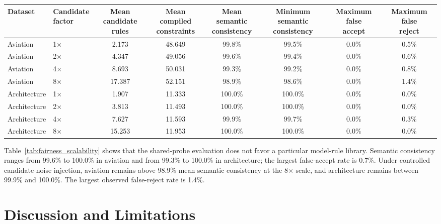﻿\documentclass[a4paper,fleqn]{cas-dc}
\begin{document}
\begin{table}[t]
\begin{tabular*}{\textwidth}{@{}l@{\extracolsep{\fill}}lcccccc@{}}
\toprule
Dataset & \shortstack{Candidate\\factor} &
\shortstack{Mean\\candidate rules} & \shortstack{Mean compiled\\constraints} &
\shortstack{Mean semantic\\consistency} & \shortstack{Minimum semantic\\consistency} &
\shortstack{Maximum false\\accept} & \shortstack{Maximum false\\reject} \\
\midrule
Aviation & 1$\times$ & 2.173 & 48.649 & 99.8\% & 99.5\% & 0.0\% & 0.5\% \\
Aviation & 2$\times$ & 4.347 & 49.056 & 99.6\% & 99.4\% & 0.0\% & 0.6\% \\
Aviation & 4$\times$ & 8.693 & 50.031 & 99.3\% & 99.2\% & 0.0\% & 0.8\% \\
Aviation & 8$\times$ & 17.387 & 52.151 & 98.9\% & 98.6\% & 0.0\% & 1.4\% \\
Architecture & 1$\times$ & 1.907 & 11.333 & 100.0\% & 100.0\% & 0.0\% & 0.0\% \\
Architecture & 2$\times$ & 3.813 & 11.493 & 100.0\% & 100.0\% & 0.0\% & 0.0\% \\
Architecture & 4$\times$ & 7.627 & 11.593 & 99.9\% & 99.7\% & 0.0\% & 0.3\% \\
Architecture & 8$\times$ & 15.253 & 11.953 & 100.0\% & 100.0\% & 0.0\% & 0.0\% \\
\bottomrule
\end{tabular*}
\endgroup
\end{table}

Table~\ref{tab:fairness_scalability} shows that the shared-probe evaluation
does not favor a particular model-rule library. Semantic consistency ranges
from 99.6\% to 100.0\% in aviation and from 99.3\% to 100.0\% in architecture;
the largest false-accept rate is 0.7\%. Under controlled candidate-noise
injection, aviation remains above 98.9\% mean semantic consistency at the
8$\times$ scale, and architecture remains between 99.9\% and 100.0\%. The
largest observed false-reject rate is 1.4\%.

\FloatBarrier


\section{Discussion and Limitations}
\label{sec:discussion_limitations}
\end{document}
